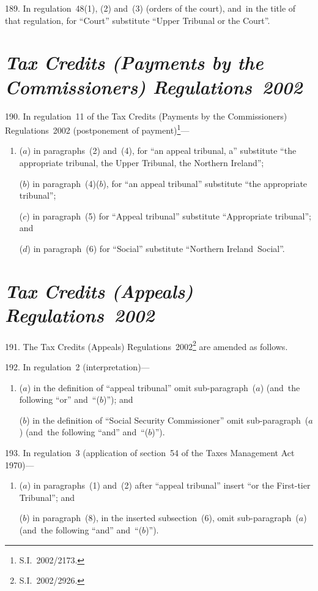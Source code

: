 \documentclass[12pt,a4paper]{article}
\begin{document}
\medskip

189.  In regulation~48(1), (2) and~(3) (orders of the court), and~in the title of that regulation, for “Court” substitute “Upper Tribunal or the Court”.

\section*{\itshape Tax Credits (Payments by the Commissioners) Regulations~2002}

190.  In regulation~11 of the Tax Credits (Payments by the Commissioners) Regulations~2002 (postponement of payment)\footnote{S.I.~2002/2173.}—
\begin{enumerate}\item[]
($a$) in paragraphs~(2) and~(4), for “an appeal tribunal, a” substitute “the appropriate tribunal, the Upper Tribunal, the Northern Ireland”;

($b$) in paragraph~(4)($b$), for “an appeal tribunal” substitute “the appropriate tribunal”;

($c$) in paragraph~(5) for “Appeal tribunal” substitute “Appropriate tribunal”; and

($d$) in paragraph~(6) for “Social” substitute “Northern Ireland~Social”.
\end{enumerate}

\section*{\itshape Tax Credits (Appeals) Regulations~2002}

191.  The Tax Credits (Appeals) Regulations~2002\footnote{S.I.~2002/2926.} are amended as follows.

\medskip

192.  In regulation~2 (interpretation)—
\begin{enumerate}\item[]
($a$) in the definition of “appeal tribunal” omit sub-paragraph~($a$)  (and~the following “or” and~“($b$)”); and

($b$) in the definition of “Social Security Commissioner” omit sub-paragraph~($a$)  (and~the following “and” and~“($b$)”).
\end{enumerate}

\medskip

193.  In regulation~3 (application of section~54 of the Taxes Management Act 1970)—
\begin{enumerate}\item[]
($a$) in paragraphs~(1) and~(2) after “appeal tribunal” insert “or the First-tier Tribunal”; and

($b$) in paragraph~(8), in the inserted subsection~(6), omit sub-paragraph~($a$)  (and~the following “and” and~“($b$)”).
\end{enumerate}
\end{document}
